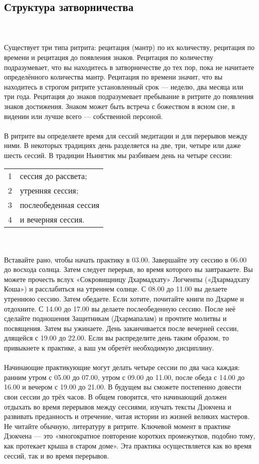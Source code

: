 \subsection*{Структура затворничества}
\\ \\ Существует три типа ритрита: рецитация (мантр) по их количеству, рецитация по времени и рецитация до появления знаков. Рецитация по количеству подразумевает, что вы находитесь в затворничестве до тех пор, пока не начитаете определённого количества мантр. Рецитация по времени значит, что вы находитесь в строгом ритрите установленный срок — неделю, два месяца или три года. Рецитация до знаков подразумевает пребывание в ритрите до появления знаков достижения. Знаком может быть встреча с божеством в ясном сне, в видении или лучше всего — собственной персоной.
\\ \\ В ритрите вы определяете время для сессий медитации и для перерывов между ними. В некоторых традициях день разделяется на две, три, четыре или даже шесть сессий. В традиции Ньингтик мы разбиваем день на четыре сессии:
\\
\indent 
\begin{tabular}{ll}
1 & сессия до рассвета;\\
2 & утренняя сессия;\\
3 & послеобеденная сессия\\
4 & и вечерняя сессия.\\
\end{tabular}
\\
\vspace{0.5cm}
\\
Вставайте рано, чтобы начать практику в 03.00. Завершайте эту сессию в 06.00 до восхода солнца. Затем следует перерыв, во время которого вы завтракаете. Вы можете прочесть вслух «Сокровищницу Дхармадхату» Логченпы («Дхармадхату Коша») и расслабиться на утреннем солнце. С 08.00 до 11.00 вы делаете утреннюю сессию. Затем обедаете. Если хотите, почитайте книги по Дхарме и отдохните. С 14.00 до 17.00 вы делаете послеобеденную сессию. После неё сделайте подношения Защитникам (Дхармапалам) и прочтите молитвы и посвящения. Затем вы ужинаете. День заканчивается после вечерней сессии, длящейся с 19.00 до 22.00. Если вы распределите день таким образом, то привыкнете к практике, а ваш ум обретёт необходимую дисциплину.
\\ \\ Начинающие практикующие могут делать четыре сессии по два часа каждая: ранним утром с 05.00 до 07.00, утром с 09.00 до 11.00, после обеда с 14.00 до 16.00 и вечером с 19.00 до 21.00. В будущем вы сможете постепенно довести свои сессии до трёх часов. В общем говорится, что начинающий должен отдыхать во время перерывов между сессиями, изучать тексты Дзокчена и развивать преданность и отречение, читая истории из жизней великих мастеров. Не читайте обычную, литературу в ритрите. Ключевой момент в практике Дзокчена — это «многократное повторение коротких промежутков, подобно тому, как протекает крыша в старом доме». Эта практика осуществляется как во время сессий, так и во время перерывов.
